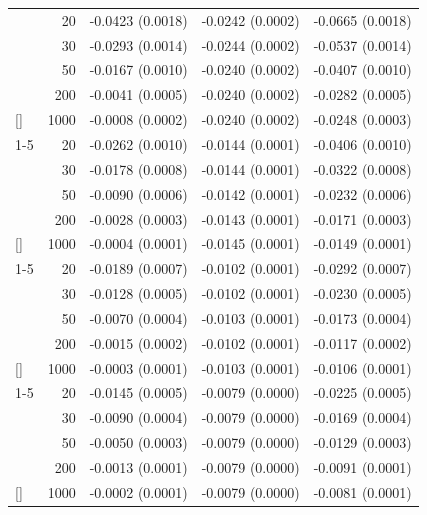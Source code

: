 \documentclass[
  nonatbib,
  authoryear,
  preprint]{elsarticle}
\begin{document}
\begin{longtable}[t]{lrrrr}
\endfoot
\bottomrule
\endlastfoot
 & 20 & -0.0423 (0.0018) & -0.0242 (0.0002) & -0.0665 (0.0018)\\
\nopagebreak
 & 30 & -0.0293 (0.0014) & -0.0244 (0.0002) & -0.0537 (0.0014)\\
\nopagebreak
 & 50 & -0.0167 (0.0010) & -0.0240 (0.0002) & -0.0407 (0.0010)\\
\nopagebreak
 & 200 & -0.0041 (0.0005) & -0.0240 (0.0002) & -0.0282 (0.0005)\\
\nopagebreak
\multirow[t]{-4}{*}[\normalbaselineskip]{\raggedright\arraybackslash 5} & 1000 & -0.0008 (0.0002) & -0.0240 (0.0002) & -0.0248 (0.0003)\\
\cmidrule{1-5}\pagebreak[0]
 & 20 & -0.0262 (0.0010) & -0.0144 (0.0001) & -0.0406 (0.0010)\\
\nopagebreak
 & 30 & -0.0178 (0.0008) & -0.0144 (0.0001) & -0.0322 (0.0008)\\
\nopagebreak
 & 50 & -0.0090 (0.0006) & -0.0142 (0.0001) & -0.0232 (0.0006)\\
\nopagebreak
 & 200 & -0.0028 (0.0003) & -0.0143 (0.0001) & -0.0171 (0.0003)\\
\nopagebreak
\multirow[t]{-4}{*}[\normalbaselineskip]{\raggedright\arraybackslash 10} & 1000 & -0.0004 (0.0001) & -0.0145 (0.0001) & -0.0149 (0.0001)\\
\cmidrule{1-5}\pagebreak[0]
 & 20 & -0.0189 (0.0007) & -0.0102 (0.0001) & -0.0292 (0.0007)\\
\nopagebreak
 & 30 & -0.0128 (0.0005) & -0.0102 (0.0001) & -0.0230 (0.0005)\\
\nopagebreak
 & 50 & -0.0070 (0.0004) & -0.0103 (0.0001) & -0.0173 (0.0004)\\
\nopagebreak
 & 200 & -0.0015 (0.0002) & -0.0102 (0.0001) & -0.0117 (0.0002)\\
\nopagebreak
\multirow[t]{-4}{*}[\normalbaselineskip]{\raggedright\arraybackslash 15} & 1000 & -0.0003 (0.0001) & -0.0103 (0.0001) & -0.0106 (0.0001)\\
\cmidrule{1-5}\pagebreak[0]
 & 20 & -0.0145 (0.0005) & -0.0079 (0.0000) & -0.0225 (0.0005)\\
\nopagebreak
 & 30 & -0.0090 (0.0004) & -0.0079 (0.0000) & -0.0169 (0.0004)\\
\nopagebreak
 & 50 & -0.0050 (0.0003) & -0.0079 (0.0000) & -0.0129 (0.0003)\\
\nopagebreak
 & 200 & -0.0013 (0.0001) & -0.0079 (0.0000) & -0.0091 (0.0001)\\
\nopagebreak
\multirow[t]{-4}{*}[\normalbaselineskip]{\raggedright\arraybackslash 20} & 1000 & -0.0002 (0.0001) & -0.0079 (0.0000) & -0.0081 (0.0001)\\

\end{longtable}
\end{document}
